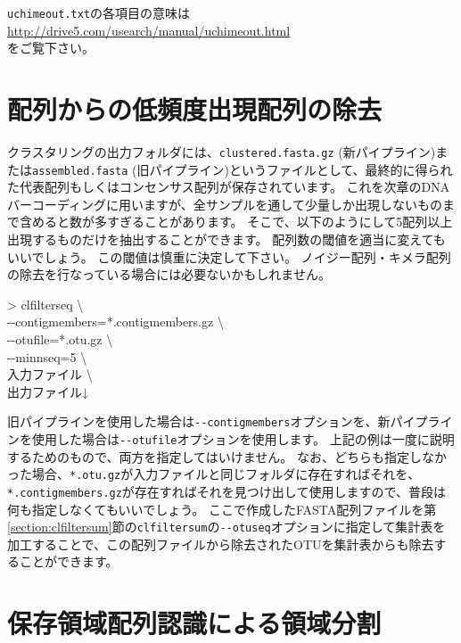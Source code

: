 \documentclass[titlepage,10pt,a4paper]{jsbook}
\newenvironment{cmd}{\begin{oframed}\raggedright\ttfamily\footnotesize\setlength{\baselineskip}{1.4em}}{\end{oframed}\vspace{-1em}}
\begin{document}
\texttt{uchimeout.txt}の各項目の意味は\\
\href{http://drive5.com/usearch/manual/uchimeout.html}{http://drive5.com/usearch/manual/uchimeout.html}\\
をご覧下さい。

\section{配列からの低頻度出現配列の除去}

クラスタリングの出力フォルダには、\texttt{clustered.fasta.gz} (新パイプライン)または\texttt{assembled.fasta} (旧パイプライン)というファイルとして、最終的に得られた代表配列もしくはコンセンサス配列が保存されています。
これを次章のDNAバーコーディングに用いますが、全サンプルを通して少量しか出現しないものまで含めると数が多すぎることがあります。
そこで、以下のようにして5配列以上出現するものだけを抽出することができます。
配列数の閾値を適当に変えてもいいでしょう。
この閾値は慎重に決定して下さい。
ノイジー配列・キメラ配列の除去を行なっている場合には必要ないかもしれません。
\begin{cmd}
{\textgreater} clfilterseq {\textbackslash}\\
{-}{-}contigmembers=*.contigmembers.gz {\textbackslash}\\
{-}{-}otufile=*.otu.gz {\textbackslash}\\
{-}{-}minnseq=5 {\textbackslash}\\
入力ファイル {\textbackslash}\\
出力ファイル↓
\end{cmd}
旧パイプラインを使用した場合は\texttt{{-}{-}contigmembers}オプションを、新パイプラインを使用した場合は\texttt{{-}{-}otufile}オプションを使用します。
上記の例は一度に説明するためのもので、両方を指定してはいけません。
なお、どちらも指定しなかった場合、\texttt{*.otu.gz}が入力ファイルと同じフォルダに存在すればそれを、\texttt{*.contigmembers.gz}が存在すればそれを見つけ出して使用しますので、普段は何も指定しなくてもいいでしょう。
ここで作成したFASTA配列ファイルを第\ref{section:clfiltersum}節の\texttt{clfiltersum}の\texttt{{-}{-}otuseq}オプションに指定して集計表を加工することで、この配列ファイルから除去されたOTUを集計表からも除去することができます。

\section{保存領域配列認識による領域分割}
\end{document}
